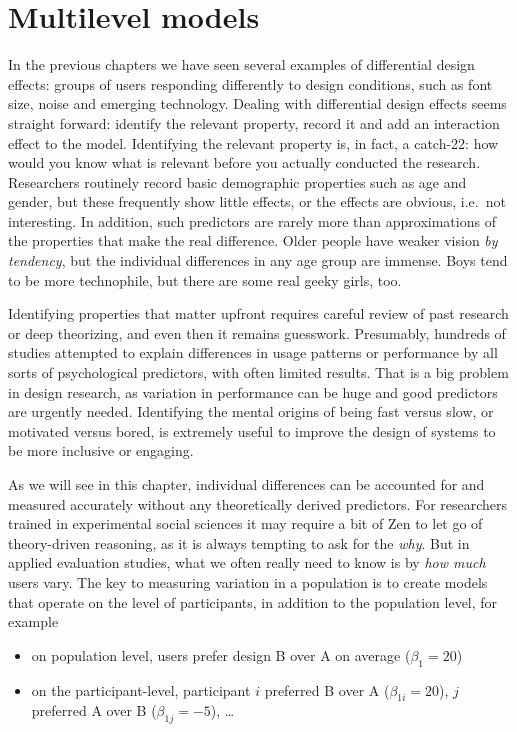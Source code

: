 \documentclass[]{svmono}
\providecommand{\tightlist}{%
  \setlength{\itemsep}{0pt}\setlength{\parskip}{0pt}}
\begin{document}
\chapter{Multilevel models}\label{multilevel-models}

In the previous chapters we have seen several examples of differential
design effects: groups of users responding differently to design
conditions, such as font size, noise and emerging technology. Dealing
with differential design effects seems straight forward: identify the
relevant property, record it and add an interaction effect to the model.
Identifying the relevant property is, in fact, a catch-22: how would you
know what is relevant before you actually conducted the research.
Researchers routinely record basic demographic properties such as age
and gender, but these frequently show little effects, or the effects are
obvious, i.e.~not interesting. In addition, such predictors are rarely
more than approximations of the properties that make the real
difference. Older people have weaker vision \emph{by tendency}, but the
individual differences in any age group are immense. Boys tend to be
more technophile, but there are some real geeky girls, too.

Identifying properties that matter upfront requires careful review of
past research or deep theorizing, and even then it remains guesswork.
Presumably, hundreds of studies attempted to explain differences in
usage patterns or performance by all sorts of psychological predictors,
with often limited results. That is a big problem in design research, as
variation in performance can be huge and good predictors are urgently
needed. Identifying the mental origins of being fast versus slow, or
motivated versus bored, is extremely useful to improve the design of
systems to be more inclusive or engaging.

As we will see in this chapter, individual differences can be accounted
for and measured accurately without any theoretically derived
predictors. For researchers trained in experimental social sciences it
may require a bit of Zen to let go of theory-driven reasoning, as it is
always tempting to ask for the \emph{why}. But in applied evaluation
studies, what we often really need to know is by \emph{how much} users
vary. The key to measuring variation in a population is to create models
that operate on the level of participants, in addition to the population
level, for example

\begin{itemize}
\tightlist
\item
  on population level, users prefer design B over A on average
  (\(\beta_1 = 20\))
\item
  on the participant-level, participant \(i\) preferred B over A
  (\(\beta_{1i} = 20\)), \(j\) preferred A over B (\(\beta_{1j} = -5\)),
  \ldots{}
\end{itemize}
\end{document}
